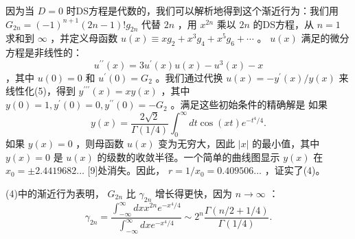 \documentclass[UTF8]{article}
\begin{document}
因为当   \( D=0 \)   时DS方程是代数的，我们可以解析地得到这个渐近行为：我们用   \( G_{2 n}=(-1)^{n+1}(2 n-1) ! g_{2 n} \)   代替   \( 2 n \)   ，用   \( x^{2 n} \)   乘以   \( 2 n \)   的DS方程，从   \( n=1 \)   求和到   \( \infty \)   ，并定义母函数   \( u(x) \equiv x g_{2}+x^{3} g_{4}+x^{5} g_{6}+\cdots \)   。   \( u(x) \)   满足的微分方程是非线性的：
   \[u^{\prime \prime}(x)=3 u^{\prime}(x) u(x)-u^{3}(x)-x
\]   ，其中   \( u(0)=0 \)   和   \( u^{\prime}(0)=G_{2} \)   。我们通过代换   \( u(x)=-y^{\prime}(x) / y(x) \)   来线性化(5)，得到   \( y^{\prime \prime \prime}(x)=x y(x) \)   ，其中   \( y(0)=1, y^{\prime}(0)=0, y^{\prime \prime}(0)=-G_{2} \)   。满足这些初始条件的精确解是
如果   \[y(x)=\frac{2 \sqrt{2}}{\Gamma(1 / 4)} \int_{0}^{\infty} d t \cos (x t) e^{-t^{4} / 4} .
\]   如果   \( y(x)=0 \)   ，则母函数   \( u(x) \)   变为无穷大，因此   \( |x| \)   的最小值，其中   \( y(x)=0 \)   是   \( u(x) \)   的级数的收敛半径。一个简单的曲线图显示   \( y(x) \)   在   \( x_{0}= \pm 2.4419682 \ldots \)   [9]处消失。因此，   \( r=1 / x_{0}=0.409506 \ldots \)   ，证实了(4)。


(4)中的渐近行为表明，   \( G_{2 n} \)   比   \( \gamma_{2 n} \)   增长得更快，因为   \( n \rightarrow \infty \)   ：
   \[
\gamma_{2 n}=\frac{\int_{-\infty}^{\infty} d x x^{2 n} e^{-x^{4} / 4}}{\int_{-\infty}^{\infty} d x e^{-x^{4} / 4}} \sim 2^{n} \frac{\Gamma(n / 2+1 / 4)}{\Gamma(1 / 4)} .
\]   
\end{document}
